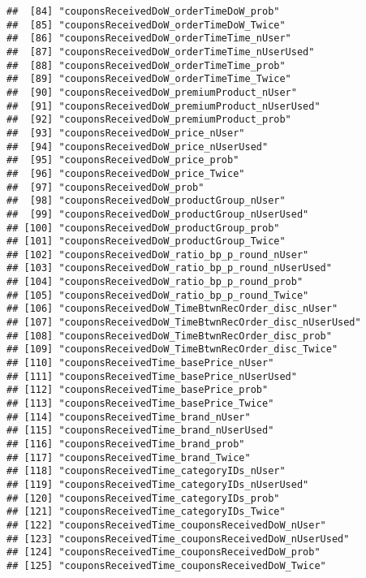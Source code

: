 \documentclass[10pt]{report}
\begin{document}
\begin{verbatim}
##  [84] "couponsReceivedDoW_orderTimeDoW_prob"               
##  [85] "couponsReceivedDoW_orderTimeDoW_Twice"              
##  [86] "couponsReceivedDoW_orderTimeTime_nUser"             
##  [87] "couponsReceivedDoW_orderTimeTime_nUserUsed"         
##  [88] "couponsReceivedDoW_orderTimeTime_prob"              
##  [89] "couponsReceivedDoW_orderTimeTime_Twice"             
##  [90] "couponsReceivedDoW_premiumProduct_nUser"            
##  [91] "couponsReceivedDoW_premiumProduct_nUserUsed"        
##  [92] "couponsReceivedDoW_premiumProduct_prob"             
##  [93] "couponsReceivedDoW_price_nUser"                     
##  [94] "couponsReceivedDoW_price_nUserUsed"                 
##  [95] "couponsReceivedDoW_price_prob"                      
##  [96] "couponsReceivedDoW_price_Twice"                     
##  [97] "couponsReceivedDoW_prob"                            
##  [98] "couponsReceivedDoW_productGroup_nUser"              
##  [99] "couponsReceivedDoW_productGroup_nUserUsed"          
## [100] "couponsReceivedDoW_productGroup_prob"               
## [101] "couponsReceivedDoW_productGroup_Twice"              
## [102] "couponsReceivedDoW_ratio_bp_p_round_nUser"          
## [103] "couponsReceivedDoW_ratio_bp_p_round_nUserUsed"      
## [104] "couponsReceivedDoW_ratio_bp_p_round_prob"           
## [105] "couponsReceivedDoW_ratio_bp_p_round_Twice"          
## [106] "couponsReceivedDoW_TimeBtwnRecOrder_disc_nUser"     
## [107] "couponsReceivedDoW_TimeBtwnRecOrder_disc_nUserUsed" 
## [108] "couponsReceivedDoW_TimeBtwnRecOrder_disc_prob"      
## [109] "couponsReceivedDoW_TimeBtwnRecOrder_disc_Twice"     
## [110] "couponsReceivedTime_basePrice_nUser"                
## [111] "couponsReceivedTime_basePrice_nUserUsed"            
## [112] "couponsReceivedTime_basePrice_prob"                 
## [113] "couponsReceivedTime_basePrice_Twice"                
## [114] "couponsReceivedTime_brand_nUser"                    
## [115] "couponsReceivedTime_brand_nUserUsed"                
## [116] "couponsReceivedTime_brand_prob"                     
## [117] "couponsReceivedTime_brand_Twice"                    
## [118] "couponsReceivedTime_categoryIDs_nUser"              
## [119] "couponsReceivedTime_categoryIDs_nUserUsed"          
## [120] "couponsReceivedTime_categoryIDs_prob"               
## [121] "couponsReceivedTime_categoryIDs_Twice"              
## [122] "couponsReceivedTime_couponsReceivedDoW_nUser"       
## [123] "couponsReceivedTime_couponsReceivedDoW_nUserUsed"   
## [124] "couponsReceivedTime_couponsReceivedDoW_prob"        
## [125] "couponsReceivedTime_couponsReceivedDoW_Twice"       

\end{verbatim}
\end{document}
